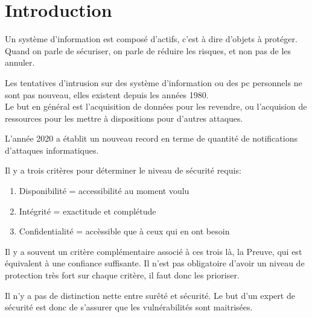 \section{Introduction}
Un système d'information est composé d'actifs, c'est à dire d'objets à protéger. Quand on parle de sécuriser, on parle
de réduire les risques, et non pas de les annuler.

Les tentatives d'intrusion sur des système d'information ou des pc personnels ne sont pas nouveau, elles existent depuis
les années 1980.\\
Le but en général est l'acquisition de données pour les revendre, ou l'acquision de ressources pour les
mettre à dispositions pour d'autres attaques.

L'année 2020 a établit un nouveau record en terme de quantité de notifications d'attaques informatiques.

Il y a trois critères pour déterminer le niveau de sécurité requis:
\begin{enumerate}
	\item Disponibilité = accessibilité au moment voulu
	\item Intégrité = exactitude et complétude
	\item Confidentialité = accèssible que à ceux qui en ont besoin
\end{enumerate}

Il y a souvent un critère complémentaire associé à ces trois là, la Preuve, qui est équivalent à une confiance
suffisante. Il n'est pas obligatoire d'avoir un niveau de protection très fort sur chaque critère, il faut donc les
prioriser.

Il n'y a pas de distinction nette entre surêté et sécurité. Le but d'un expert de sécurité est donc de s'assurer que
les vulnérabilités sont maitrisées.
